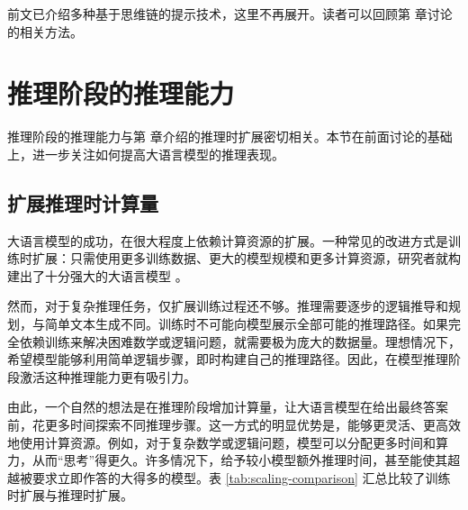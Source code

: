 前文已介绍多种基于思维链的提示技术，这里不再展开。读者可以回顾第 \ChapterLLMPrompting 章讨论的相关方法。



\section{推理阶段的推理能力}
\label{sec:inference-time-reasoning}

推理阶段的推理能力与第 \ChapterLLMInference 章介绍的推理时扩展密切相关。本节在前面讨论的基础上，进一步关注如何提高大语言模型的推理表现。

\subsection{扩展推理时计算量}

大语言模型的成功，在很大程度上依赖计算资源的扩展。一种常见的改进方式是训练时扩展：只需使用更多训练数据、更大的模型规模和更多计算资源，研究者就构建出了十分强大的大语言模型 \cite{kaplan-etal:2020scaling,hoffmann-etal:2022training}。

然而，对于复杂推理任务，仅扩展训练过程还不够。推理需要逐步的逻辑推导和规划，与简单文本生成不同。训练时不可能向模型展示全部可能的推理路径。如果完全依赖训练来解决困难数学或逻辑问题，就需要极为庞大的数据量。理想情况下，希望模型能够利用简单逻辑步骤，即时构建自己的推理路径。因此，在模型推理阶段激活这种推理能力更有吸引力。

由此，一个自然的想法是在推理阶段增加计算量，让大语言模型在给出最终答案前，花更多时间探索不同推理步骤。这一方式的明显优势是，能够更灵活、更高效地使用计算资源。例如，对于复杂数学或逻辑问题，模型可以分配更多时间和算力，从而“思考”得更久。许多情况下，给予较小模型额外推理时间，甚至能使其超越被要求立即作答的大得多的模型。表 \ref{tab:scaling-comparison} 汇总比较了训练时扩展与推理时扩展。


